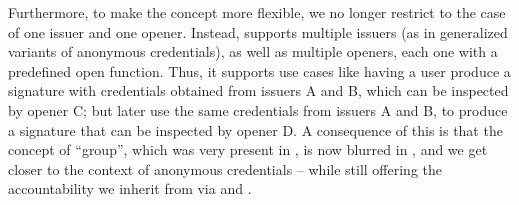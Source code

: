 Furthermore, to make the concept more flexible, we no longer restrict to the
case of one issuer and one opener. Instead, \UAS supports multiple issuers (as
in generalized variants of anonymous credentials), as well as multiple openers,
each one with a predefined open function. Thus, it supports use cases like
having a user produce a signature with credentials obtained from issuers A and
B, which can be inspected by opener C; but later use the same credentials
from issuers A and B, to produce a signature that can be inspected by opener D.
A consequence of this is that the concept of ``group'', which was very present
in \GSAC, is now blurred in \UAS, and we get closer to the context of anonymous
credentials -- while still offering the accountability we inherit from \GSAC
via \Open and \Judge.






